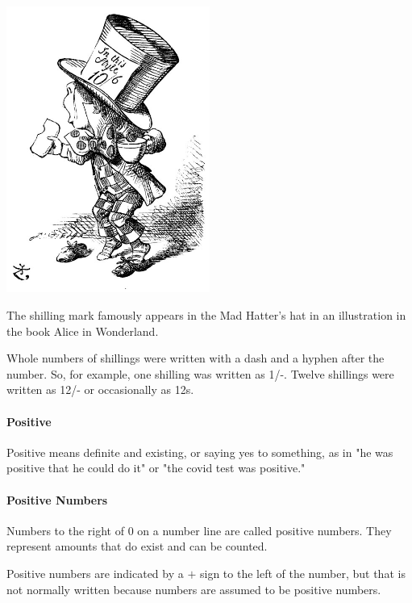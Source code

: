 \documentclass[12pt]{article}
\begin{document}
{\begin{center}
\includegraphics[width=0.5\textwidth]{madhatter}
\end{center}

The shilling mark famously appears in the Mad Hatter's hat in an illustration in the book Alice in Wonderland.

Whole numbers of shillings were written with a dash and a hyphen after the number. So, for example, one shilling was written as 1/-. Twelve shillings were written as 12/- or occasionally as 12s.

\paragraph{Positive}
Positive means definite and existing, or saying yes to something, as in "he was positive that he could do it" or "the covid test was positive."

\paragraph{Positive Numbers}
Numbers to the right of 0 on a number line are called positive numbers. They represent amounts that do exist and can be counted.
\begin{center}
\end{center}
Positive numbers are indicated by a $+$ sign to the left of the number, but that is not normally written because numbers are assumed to be positive numbers.

}
\end{document}
